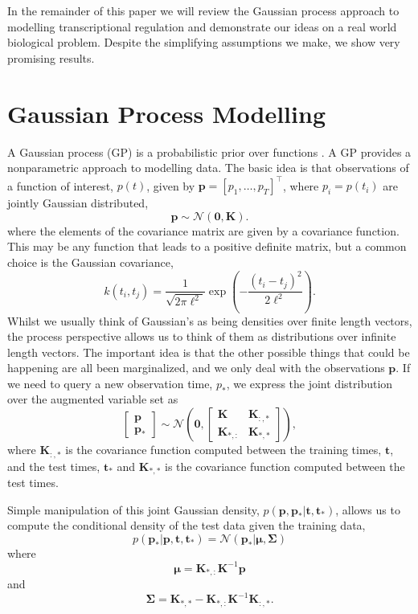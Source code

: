 \documentclass{article}
\begin{document}
In the remainder of this paper we will review the Gaussian process
approach to modelling transcriptional regulation and demonstrate our
ideas on a real world biological problem. Despite the simplifying
assumptions we make, we show very promising results.

\section{Gaussian Process Modelling}

A  Gaussian  process (GP)  is  a  probabilistic  prior over  functions
\cite{Rasmussen:book06}.  A GP  provides a  nonparametric  approach to
modelling data. The  basic idea is that observations  of a function of
interest,   $p(t)$,   given  by   $\mathbf{p}   =  \left[p_1,   \dots,
  p_T\right]^\top$,   where    $p_i=p(t_i)$   are   jointly   Gaussian
distributed,
\[
\mathbf{p} \sim \mathcal{N}(\mathbf{0}, \mathbf{K}).
\]
where the elements of the  covariance matrix are given by a covariance
function. This may  be any function that leads  to a positive definite
matrix, but a common choice is the Gaussian covariance,
\[
k(t_i,   t_j)   =  \frac{1}{\sqrt{2\pi   \ell^2}}\exp\left(-\frac{(t_i
    -t_j)^2}{2\ell^2}\right).
\]
Whilst we usually  think of Gaussian's as being  densities over finite
length vectors, the process perspective  allows us to think of them as
distributions over infinite length vectors. The important idea is that
the  other  possible things  that  could  be  happening are  all  been
marginalized, and we only  deal with the observations $\mathbf{p}$. If
we need to  query a new observation time, $p_*$,  we express the joint
distribution over the augmented variable set as
\[
\left[\begin{matrix}
  \mathbf{p}\\
\mathbf{p}_*
\end{matrix}\right]
\sim \mathcal{N}\left(\mathbf{0}, \left[\begin{matrix}
      \mathbf{K} & \mathbf{K}_{:,*}\\
      \mathbf{K}_{*,:} & \mathbf{K}_{*,*}
      \end{matrix}
\right]\right),
\]
where $\mathbf{K}_{:,*}$  is the covariance  function computed between
the training  times, $\mathbf{t}$, and the  test times, $\mathbf{t}_*$
and $\mathbf{K}_{*,*}$ is the covariance function computed between the
test times.

Simple  manipulation of  this joint  Gaussian  density, $p(\mathbf{p},
\mathbf{p_*}|\mathbf{t},  \mathbf{t}_*)$,  allows  us to  compute  the
conditional density of the test data given the training data,
\[
p(\mathbf{p}_* | \mathbf{p}, \mathbf{t}, \mathbf{t}_*) = \mathcal{N}\left(\mathbf{p}_*|\boldsymbol{\mu}, \boldsymbol{\Sigma}\right)
\]
where
\[
\boldsymbol{\mu} = \mathbf{K}_{*,:}\mathbf{K}^{-1}\mathbf{p}
\]
and 
\[
\boldsymbol{\Sigma} = \mathbf{K}_{*,*} - \mathbf{K}_{*,:}\mathbf{K}^{-1}\mathbf{K}_{:,*}.
\]
\end{document}
